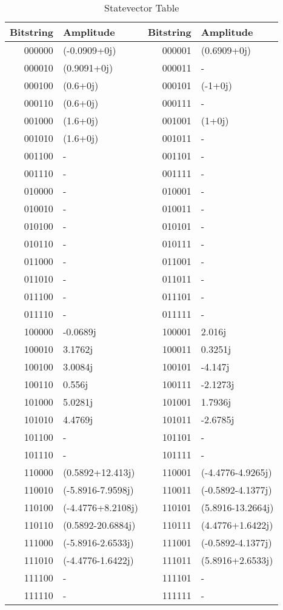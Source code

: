 \begin{table}[H]
\centering
\caption{Statevector Table}
\label{tab:sv_for_PFC}
\begin{tabular}{@{}rlrl@{}}
\toprule
Bitstring & {Amplitude} & Bitstring & {Amplitude} \\
\midrule
000000 & (-0.0909+0j) & 000001 & (0.6909+0j) \\
000010 & (0.9091+0j) & 000011 & {-} \\
000100 & (0.6+0j) & 000101 & (-1+0j) \\
000110 & (0.6+0j) & 000111 & {-} \\
001000 & (1.6+0j) & 001001 & (1+0j) \\
001010 & (1.6+0j) & 001011 & {-} \\
001100 & {-} & 001101 & {-} \\
001110 & {-} & 001111 & {-} \\
010000 & {-} & 010001 & {-} \\
010010 & {-} & 010011 & {-} \\
010100 & {-} & 010101 & {-} \\
010110 & {-} & 010111 & {-} \\
011000 & {-} & 011001 & {-} \\
011010 & {-} & 011011 & {-} \\
011100 & {-} & 011101 & {-} \\
011110 & {-} & 011111 & {-} \\
100000 & -0.0689j & 100001 & 2.016j \\
100010 & 3.1762j & 100011 & 0.3251j \\
100100 & 3.0084j & 100101 & -4.147j \\
100110 & 0.556j & 100111 & -2.1273j \\
101000 & 5.0281j & 101001 & 1.7936j \\
101010 & 4.4769j & 101011 & -2.6785j \\
101100 & {-} & 101101 & {-} \\
101110 & {-} & 101111 & {-} \\
110000 & (0.5892+12.413j) & 110001 & (-4.4776-4.9265j) \\
110010 & (-5.8916-7.9598j) & 110011 & (-0.5892-4.1377j) \\
110100 & (-4.4776+8.2108j) & 110101 & (5.8916-13.2664j) \\
110110 & (0.5892-20.6884j) & 110111 & (4.4776+1.6422j) \\
111000 & (-5.8916-2.6533j) & 111001 & (-0.5892-4.1377j) \\
111010 & (-4.4776-1.6422j) & 111011 & (5.8916+2.6533j) \\
111100 & {-} & 111101 & {-} \\
111110 & {-} & 111111 & {-} \\
\bottomrule
\end{tabular}\end{table}